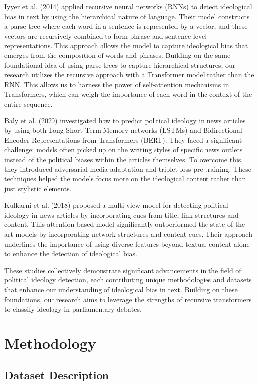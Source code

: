 \documentclass[10pt, a4paper]{article}
\begin{document}
Iyyer et al. (2014) applied recursive neural networks (RNNs) to detect ideological bias in text by using the hierarchical nature of language. Their model constructs a parse tree where each word in a sentence is represented by a vector, and these vectors are recursively combined to form phrase and sentence-level representations. This approach allows the model to capture ideological bias that emerges from the composition of words and phrases. Building on the same foundational idea of using parse trees to capture hierarchical structures, our research utilizes the recursive approach with a Transformer model rather than the RNN. This allows us to harness the power of self-attention mechanisms in Transformers, which can weigh the importance of each word in the context of the entire sequence.

Baly et al. (2020) investigated how to predict political ideology in news articles by using both Long Short-Term Memory networks (LSTMs) and Bidirectional Encoder Representations from Transformers (BERT). They faced a significant challenge: models often picked up on the writing styles of specific news outlets instead of the political biases within the articles themselves. To overcome this, they introduced adversarial media adaptation and triplet loss pre-training. These techniques helped the models focus more on the ideological content rather than just stylistic elements.

Kulkarni et al. (2018) proposed a multi-view model for detecting political ideology in news articles by incorporating cues from title, link structures and content. This attention-based model significantly outperformed the state-of-the-art models by incorporating network structures and content cues. Their approach underlines the importance of using diverse features beyond textual content alone to enhance the detection of ideological bias.

These studies collectively demonstrate significant advancements in the field of political ideology detection, each contributing unique methodologies and datasets that enhance our understanding of ideological bias in text. Building on these foundations, our research aims to leverage the strengths of recursive transformers to classify ideology in parliamentary debates.

\section{Methodology}

\subsection{Dataset Description}
\label{sec:first}
\end{document}
